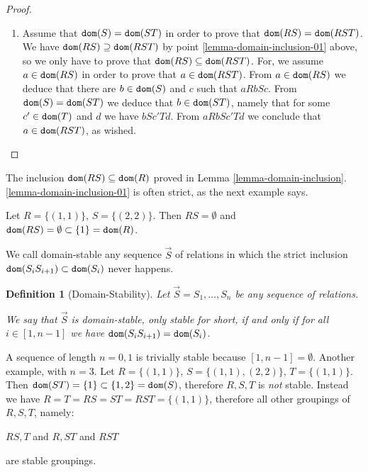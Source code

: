 \documentclass{lmcs}
\newtheorem{definition}[theorem]{Definition}
\newenvironment{example}[1][Example]
{\begin{trivlist} \item[\hskip \labelsep {\bfseries #1}]}{\end{trivlist}}
\begin{document}
\begin{proof}
\begin{enumerate}
\item
Assume that ${\tt dom}(S) = {\tt dom}(ST)$ in order to prove that 
${\tt dom}(RS) = {\tt dom}(RST)$. 
We have ${\tt dom}(RS) \supseteq {\tt dom}(RST)$ by point \ref{lemma-domain-inclusion-01} above,
so we only have to prove that ${\tt dom}(RS) \subseteq {\tt dom}(RST)$.
For, we assume $a \in {\tt dom}(RS)$ in order to prove that $a \in {\tt dom}(RST)$. 
From $a \in {\tt dom}(RS)$ we deduce that there are $b \in {\tt dom}(S)$ and $c$ such that $a R b S c$. 
From  ${\tt dom}(S) = {\tt dom}(ST)$ we deduce that $b \in {\tt dom}(ST)$, namely that
for some $c' \in {\tt dom}(T)$ and $d$ we have $b S c' T d$. From $a R b S c' T d$ we conclude
that $a \in {\tt dom}(RST)$, as wished.

\end{enumerate}
\end{proof}

The inclusion ${\tt dom}(RS) \subseteq {\tt dom}(R)$ proved in
Lemma \ref{lemma-domain-inclusion}.\ref{lemma-domain-inclusion-01}
is often strict, as the next example says. 

\begin{example} 
\label{example-domain-inclusion}
Let $R = \{(1,1)\}$, $S = \{(2,2)\}$. Then $RS=\emptyset$ and 
${\tt dom}(RS) = \emptyset \subset \{1\} = {\tt dom}(R) $. 
\end{example}

We call domain-stable any sequence $\vec{S}$ of relations in which the strict
inclusion ${\tt dom}(S_i S_{i+1}) \subset {\tt dom}(S_i)$ never happens.
 
\begin{definition}[Domain-Stability]
Let $\vec{S}=S_1, \ldots, S_n$ be any sequence of relations. 

We say that $\vec{S}$ is domain-stable, only \emph{stable} for short, 
if and only if for all $i \in [1,n-1]$ we have ${\tt dom}(S_i S_{i+1}) = {\tt dom}(S_i)$.

\end{definition}


\begin{example}
\label{example-stable}
A sequence of length $n=0,1$ is trivially stable because $[1,n-1] = \emptyset$. 
Another example, with $n=3$. Let $R=\{(1,1)\}$, $S=\{(1,1),(2,2)\}$, $T=\{(1,1)\}$.
Then ${\tt dom}(ST) = \{1\} \subset \{1,2\} = {\tt dom}(S)$, therefore $R,S,T$ is \emph{not} stable.
Instead we have $R=T=RS=ST=RST=\{(1,1)\}$, therefore all other groupings  of
$R,S,T$, namely:
\begin{center}
$RS,T$ and $R,ST$ and $RST$
\end{center} 
are stable groupings.
\end{example}
\end{document}
